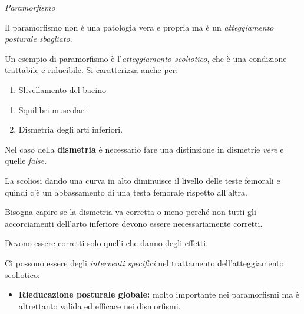 \documentclass[]{article}
\date{}
\begin{document}
\emph{Paramorfismo}

Il paramorfismo non è una patologia vera e propria ma è un
\emph{atteggiamento posturale sbagliato}.

Un esempio di paramorfismo è l'\emph{atteggiamento scoliotico}, che è
una condizione trattabile e riducibile. Si caratterizza anche per:

\begin{enumerate}
\def\labelenumi{\arabic{enumi}.}
\item
  Slivellamento del bacino
\end{enumerate}

\begin{enumerate}
\def\labelenumi{\arabic{enumi}.}
\item
  Squilibri muscolari
\item
  Dismetria degli arti inferiori.
\end{enumerate}

Nel caso della \textbf{dismetria} è necessario fare una distinzione in
dismetrie \emph{vere} e quelle \emph{false}.

La scoliosi dando una curva in alto diminuisce il livello delle teste
femorali e quindi c'è un abbassamento di una testa femorale rispetto
all'altra.

Bisogna capire se la dismetria va corretta o meno perché non tutti gli
accorciamenti dell'arto inferiore devono essere necessariamente
corretti.

Devono essere corretti solo quelli che danno degli effetti.

Ci possono essere degli \emph{interventi specifici} nel trattamento
dell'atteggiamento scoliotico:

\begin{itemize}
\item
  \textbf{Rieducazione posturale globale:} molto importante nei
  paramorfismi ma è altrettanto valida ed efficace nei dismorfismi.
\end{itemize}
\end{document}
